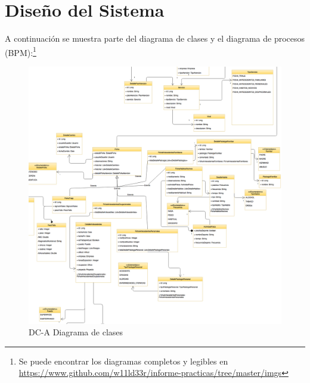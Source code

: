 \newpage
\section{Diseño del Sistema}
	A continuación se muestra parte del diagrama de clases y el diagrama de
	procesos (BPM):\footnote{Se puede encontrar los diagramas completos y legibles
	en
	\href{https://www.github.com/w11ld33r/informe-practicas/tree/master/imgs}{https://www.github.com/w11ld33r/informe-practicas/tree/master/imgs}}

	\begin{figure}[H]
	    \centering
		\includegraphics[width=17cm]{../imgs/disenio/DC2.png}
		\caption{DC-A Diagrama de clases}
	\end{figure}
